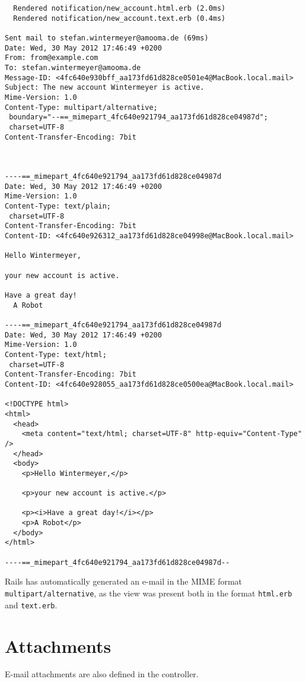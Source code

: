 \documentclass[a4paper]{book}
\begin{document}
\begin{shaded}\begin{verbatim}
  Rendered notification/new_account.html.erb (2.0ms)
  Rendered notification/new_account.text.erb (0.4ms)

Sent mail to stefan.wintermeyer@amooma.de (69ms)
Date: Wed, 30 May 2012 17:46:49 +0200
From: from@example.com
To: stefan.wintermeyer@amooma.de
Message-ID: <4fc640e930bff_aa173fd61d828ce0501e4@MacBook.local.mail>
Subject: The new account Wintermeyer is active.
Mime-Version: 1.0
Content-Type: multipart/alternative;
 boundary="--==_mimepart_4fc640e921794_aa173fd61d828ce04987d";
 charset=UTF-8
Content-Transfer-Encoding: 7bit



----==_mimepart_4fc640e921794_aa173fd61d828ce04987d
Date: Wed, 30 May 2012 17:46:49 +0200
Mime-Version: 1.0
Content-Type: text/plain;
 charset=UTF-8
Content-Transfer-Encoding: 7bit
Content-ID: <4fc640e926312_aa173fd61d828ce04998e@MacBook.local.mail>

Hello Wintermeyer,

your new account is active.

Have a great day!
  A Robot

----==_mimepart_4fc640e921794_aa173fd61d828ce04987d
Date: Wed, 30 May 2012 17:46:49 +0200
Mime-Version: 1.0
Content-Type: text/html;
 charset=UTF-8
Content-Transfer-Encoding: 7bit
Content-ID: <4fc640e928055_aa173fd61d828ce0500ea@MacBook.local.mail>

<!DOCTYPE html>
<html>
  <head>
    <meta content="text/html; charset=UTF-8" http-equiv="Content-Type" />
  </head>
  <body>
    <p>Hello Wintermeyer,</p>

    <p>your new account is active.</p>

    <p><i>Have a great day!</i></p>
    <p>A Robot</p>
  </body>
</html>

----==_mimepart_4fc640e921794_aa173fd61d828ce04987d--
\end{verbatim}\end{shaded}

Rails has automatically generated an e-mail in the MIME format \texttt{multipart/alternative}, as the view was present both in the format \texttt{html.erb} and \texttt{text.erb}.

\section{Attachments}\label{attachments}

E-mail attachments are also defined in the controller.
\end{document}
